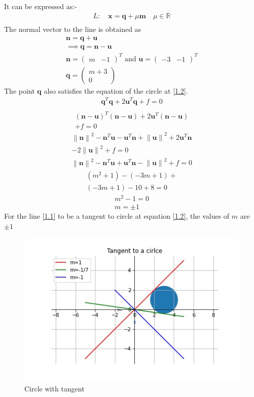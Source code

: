 \documentclass[journal,12pt,twocolumn]{IEEEtran}
\let\vec\mathbf
\numberwithin{equation}{subsection}
\newcommand{\myvec}[1]{\ensuremath{\begin{pmatrix}#1\end{pmatrix}}}
\newcommand{\norm}[1]{\left\lVert#1\right\rVert}
\begin{document}
It can be expressed as:-
\begin{align}
L: \quad \vec{x} = \vec{q} + \mu \vec{m} \quad \mu \in \mathbb{R} \label{2.10} \\
\end{align}
The normal vector to the line is obtained as
\begin{align}
\vec{n} = \vec{q} + \vec{u}\\
\implies \vec{q}  = \vec{n} -  \vec{u}\\
\vec{n} =\myvec{m & -1 }^T  \text{ and } \vec{u} =\myvec{-3 & -1}^T\\
\vec{q} = \myvec{m+3 \\ 0}
\end{align}
The point $\vec{q}$ also satisfies the equation of the circle at \ref{1.2}.
\begin{align}
\vec{q}^T\vec{q}+ 2\vec{u}^T\vec{q} + f = 0 \\
\end{align}
\begin{multline}
(\vec{n} -\vec{ u})^T(\vec{n} -\vec{ u})+2\vec{u}^T(\vec{n} -\vec{ u})\\+f = 0
\end{multline}
\begin{multline}
\norm{\vec{n}}^2 - \vec{n}^T \vec{u} - \vec{u}^T\vec{n} + \norm{\vec{u}}^2  + 2\vec{u}^T\vec{n}\\ -2 \norm{\vec{u}}^2 +f = 0 
\end{multline}
\begin{multline}
\norm{\vec{n}}^2 - \vec{n}^T \vec{u} +\vec{u}^T\vec{n} - \norm{\vec{u}}^2  +f = 0 
\end{multline}
\begin{multline}
(m^2 +1) - (-3m + 1) +\\(-3m + 1) - 10 +8 = 0 
\end{multline}
\begin{align}
m^2 -1 =0\\
m=\pm 1
\end{align}
For the line \ref{1.1} to be a tangent to circle at equation \ref{1.2}, the values of $m$ are $\pm1$
\begin{figure}[!]
\includegraphics[width=1\columnwidth]{tangent.jpg}
\caption{Circle with tangent}
\end{figure}
\end{document}

